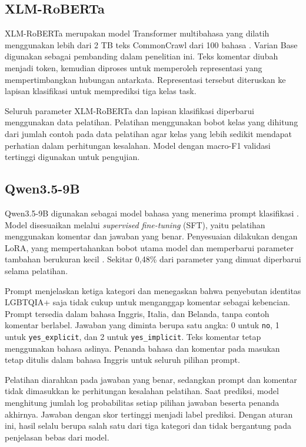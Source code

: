 \documentclass[11pt]{article}
\begin{document}
\subsection{XLM-RoBERTa}
XLM-RoBERTa merupakan model Transformer multibahasa yang dilatih menggunakan lebih dari 2 TB teks CommonCrawl dari 100 bahasa \citep{conneau-etal-2020-unsupervised}. Varian Base digunakan sebagai pembanding dalam penelitian ini. Teks komentar diubah menjadi token, kemudian diproses untuk memperoleh representasi yang mempertimbangkan hubungan antarkata. Representasi tersebut diteruskan ke lapisan klasifikasi untuk memprediksi tiga kelas task.

Seluruh parameter XLM-RoBERTa dan lapisan klasifikasi diperbarui menggunakan data pelatihan. Pelatihan menggunakan bobot kelas yang dihitung dari jumlah contoh pada data pelatihan agar kelas yang lebih sedikit mendapat perhatian dalam perhitungan kesalahan. Model dengan macro-F1 validasi tertinggi digunakan untuk pengujian.

\subsection{Qwen3.5-9B}
Qwen3.5-9B digunakan sebagai model bahasa yang menerima prompt klasifikasi \citep{qwen-team-2026-qwen35}. Model disesuaikan melalui \textit{supervised fine-tuning} (SFT), yaitu pelatihan menggunakan komentar dan jawaban yang benar. Penyesuaian dilakukan dengan LoRA, yang mempertahankan bobot utama model dan memperbarui parameter tambahan berukuran kecil \citep{hu-etal-2021-lora}. Sekitar 0,48\% dari parameter yang dimuat diperbarui selama pelatihan.

Prompt menjelaskan ketiga kategori dan menegaskan bahwa penyebutan identitas LGBTQIA+ saja tidak cukup untuk menganggap komentar sebagai kebencian. Prompt tersedia dalam bahasa Inggris, Italia, dan Belanda, tanpa contoh komentar berlabel. Jawaban yang diminta berupa satu angka: 0 untuk \texttt{no}, 1 untuk \texttt{yes\_explicit}, dan 2 untuk \texttt{yes\_implicit}. Teks komentar tetap menggunakan bahasa aslinya. Penanda bahasa dan komentar pada masukan tetap ditulis dalam bahasa Inggris untuk seluruh pilihan prompt.

Pelatihan diarahkan pada jawaban yang benar, sedangkan prompt dan komentar tidak dimasukkan ke perhitungan kesalahan pelatihan. Saat prediksi, model menghitung jumlah log probabilitas setiap pilihan jawaban beserta penanda akhirnya. Jawaban dengan skor tertinggi menjadi label prediksi. Dengan aturan ini, hasil selalu berupa salah satu dari tiga kategori dan tidak bergantung pada penjelasan bebas dari model.
\end{document}
